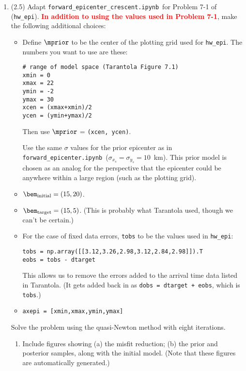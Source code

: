 \documentclass[11pt,titlepage,fleqn]{article}
\newcommand{\tfileFE}{{\tt forward\_epicenter.ipynb}}
\newcommand{\tfileFEC}{{\tt forward\_epicenter\_crescent.ipynb}}
\begin{document}
\begin{enumerate}

\item (2.5) Adapt \tfileFEC\ for Problem 7-1 of \citet{Tarantola2005} (\verb+hw_epi+). \textcolor{red}{\bf In addition to using the values used in Problem 7-1}, make the following additional choices:
%
\begin{itemize}
\item Define $\mprior$ to be the center of the plotting grid used for \verb+hw_epi+. The numbers you want to use are these:
%
\begin{verbatim}
# range of model space (Tarantola Figure 7.1)
xmin = 0
xmax = 22
ymin = -2
ymax = 30
xcen = (xmax+xmin)/2
ycen = (ymin+ymax)/2
\end{verbatim}
%
Then use $\mprior$ = \verb+(xcen, ycen)+.

Use the same $\sigma$ values for the prior epicenter as in \tfileFE\ ($\sigma_{x_s} = \sigma_{y_s} = 10$~km). This prior model is chosen as an analog for the perspective that the epicenter could be anywhere within a large region (such as the plotting grid).

\item $\bem_{\rm initial} = (15, 20)$.

\item $\bem_{\rm target} = (15, 5)$. (This is probably what Tarantola used, though we can't be certain.)

\item For the case of fixed data errors, \verb+tobs+ to be the values used in \verb+hw_epi+:
%
\begin{verbatim}
tobs = np.array([[3.12,3.26,2.98,3.12,2.84,2.98]]).T
eobs = tobs - dtarget
\end{verbatim}
%
This allows us to remove the errors added to the arrival time data listed in Tarantola. (It gets added back in as {\tt dobs = dtarget + eobs}, which is \verb+tobs+.)

\item \verb+axepi = [xmin,xmax,ymin,ymax]+

\end{itemize}

Solve the problem using the quasi-Newton method with eight iterations.
%
\begin{enumerate}
\item Include figures showing (a) the misfit reduction; (b) the prior and posterior samples, along with the initial model. (Note that these figures are automatically generated.)


\end{enumerate}
\end{enumerate}
\end{document}

